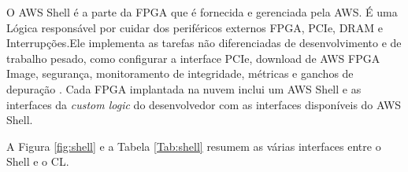 O AWS Shell é a parte da FPGA que é fornecida e gerenciada pela AWS. É uma Lógica responsável por cuidar dos periféricos externos FPGA, PCIe, DRAM e Interrupções.Ele  implementa as tarefas não diferenciadas de desenvolvimento e de trabalho pesado, como configurar a interface PCIe, download de AWS FPGA Image, segurança, monitoramento de integridade, métricas e ganchos de depuração \cite{awsfaq}. Cada FPGA implantada na nuvem inclui um AWS Shell e as interfaces da \textit{custom logic} do desenvolvedor com as interfaces disponíveis do AWS Shell.

A Figura \ref{fig:shell} e a Tabela \ref{Tab:shell} resumem as várias interfaces entre o Shell e o CL.



\begin{figure}[htb!] 
   	    \captionsetup{width=15cm}%
\end{figure}


